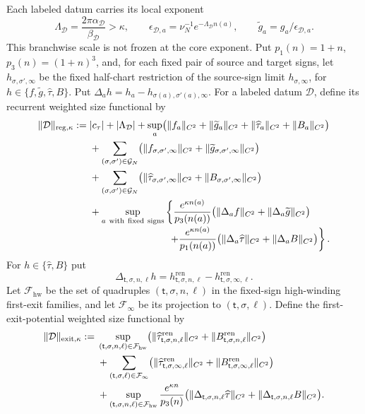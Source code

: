 \documentclass[11pt]{amsart}
\numberwithin{equation}{section}
\theoremstyle{definition}
\theoremstyle{remark}
\begin{document}
Each labeled datum carries its local exponent
\[
 \Lambda_{\mathcal D}=\frac{2\pi\alpha_{\mathcal D}}
                            {\beta_{\mathcal D}}>\kappa,
 \qquad
 \epsilon_{\mathcal D,a}
   =\nu_N^{-1}e^{-\Lambda_{\mathcal D}n(a)},
 \qquad
 \widetilde g_a=g_a/\epsilon_{\mathcal D,a}.
\]
This branchwise scale is not frozen at the core exponent.
Put $p_1(n)=1+n$, $p_3(n)=(1+n)^3$, and, for each fixed pair of source and
target signs, let
$h_{\sigma,\sigma',\infty}$ be the fixed half-chart restriction of the
source-sign limit $h_{\sigma,\infty}$, for
$h\in\{f,\widetilde g,\widehat\tau,B\}$.  Put
$\Delta_a h=h_a-h_{\sigma(a),\sigma'(a),\infty}$.  For a labeled datum
$\mathcal D$, define its recurrent weighted size functional by
\begin{align}
 \|\mathcal D\|_{\mathrm{reg},\kappa}
 :={}&|c_\tau|+|\Lambda_{\mathcal D}|
 +\sup_a\bigl(\|f_a\|_{C^2}+\|\widetilde g_a\|_{C^2}
       +\|\widehat\tau_a\|_{C^2}+\|B_a\|_{C^2}\bigr)
 \notag\\
 &+\sum_{(\sigma,\sigma')\in\mathcal G_N}
   \bigl(\|f_{\sigma,\sigma',\infty}\|_{C^2}
        +\|\widetilde g_{\sigma,\sigma',\infty}\|_{C^2}\bigr)
 \notag\\
 &+\sum_{(\sigma,\sigma')\in\mathcal G_N}
   \bigl(\|\widehat\tau_{\sigma,\sigma',\infty}\|_{C^2}
        +\|B_{\sigma,\sigma',\infty}\|_{C^2}\bigr)
 \notag\\
 &+\sup_{a\ {\rm with\ fixed\ signs}}
 \left\{
 \frac{e^{\kappa n(a)}}{p_3(n(a))}
   \bigl(\|\Delta_af\|_{C^2}
        +\|\Delta_a\widetilde g\|_{C^2}\bigr)
 \right.\notag\\[-1mm]
 &\hspace{28mm}\left.
 +\frac{e^{\kappa n(a)}}{p_1(n(a))}
   \bigl(\|\Delta_a\widehat\tau\|_{C^2}
        +\|\Delta_aB\|_{C^2}\bigr)
 \right\}.
\label{eq:app-regular-metric}
\end{align}
For $h\in\{\widehat\tau,B\}$ put
\[
 \Delta_{\mathsf t,\sigma,n,\ell}h
 =h_{\mathsf t,\sigma,n,\ell}^{\mathrm{ren}}
  -h_{\mathsf t,\sigma,\infty,\ell}^{\mathrm{ren}}.
\]
Let $\mathcal F_{\mathrm{hw}}$ be the set of quadruples
$(\mathsf t,\sigma,n,\ell)$ in the fixed-sign high-winding first-exit
families, and let $\mathcal F_\infty$ be its projection to
$(\mathsf t,\sigma,\ell)$.  Define the first-exit-potential weighted size
functional by
\begin{align}
 \|\mathcal D\|_{\mathrm{exit},\kappa}
 :={}&\sup_{(\mathsf t,\sigma,n,\ell)\in\mathcal F_{\mathrm{hw}}}\bigl(
   \|\widehat\tau_{\mathsf t,\sigma,n,\ell}^{\mathrm{ren}}\|_{C^2}
   +\|B_{\mathsf t,\sigma,n,\ell}^{\mathrm{ren}}\|_{C^2}\bigr)
 \notag\\
 &+\sum_{(\mathsf t,\sigma,\ell)\in\mathcal F_\infty}\bigl(
   \|\widehat\tau_{\mathsf t,\sigma,\infty,\ell}^{\mathrm{ren}}\|_{C^2}
   +\|B_{\mathsf t,\sigma,\infty,\ell}^{\mathrm{ren}}\|_{C^2}\bigr)
 \notag\\
 &+\sup_{(\mathsf t,\sigma,n,\ell)\in\mathcal F_{\mathrm{hw}}}
 \frac{e^{\kappa n}}{p_3(n)}
 \bigl(
 \|\Delta_{\mathsf t,\sigma,n,\ell}\widehat\tau\|_{C^2}
 +\|\Delta_{\mathsf t,\sigma,n,\ell}B\|_{C^2}\bigr).
\label{eq:app-terminal-metric}
\end{align}
\end{document}
